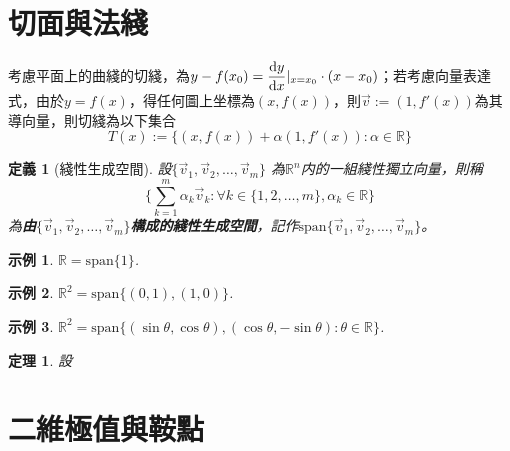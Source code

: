 \documentclass[12pt]{article}
\newtheorem{definition}{定義}
\newtheorem*{theorem}{定理}
\newtheorem*{example}{示例}
\begin{document}
    \section*{切面與法綫}

    考慮平面上的曲綫的切綫，為$\displaystyle y-f(x_0)=\derivative{y}{x}|_{x=x_0} \cdot (x-x_0)$；若考慮向量表達式，由於$y=f(x)$，得任何圖上坐標為$(x,f(x))$，則$\vec{v}:=(1,f'(x))$為其導向量，則切綫為以下集合$$T(x):=\{(x,f(x))+\alpha(1,f'(x)):\alpha\in\mathbb{R}\}$$

    \begin{definition}[綫性生成空間]
        設$\{\vec{v}_1, \vec{v}_2,\dots,\vec{v}_m\}$ 為$\mathbb{R}^n$内的一組綫性獨立向量，則稱$$\{\sum_{k=1}^{m}\alpha_k \vec{v}_k: \forall k \in \{1,2,\dots,m\},\alpha_k\in\mathbb{R}\}$$
        為\textbf{由$\{\vec{v}_1, \vec{v}_2,\dots,\vec{v}_m\}$構成的綫性生成空間}，記作$\mathrm{span}\{\vec{v}_1, \vec{v}_2,\dots, \vec{v}_m\}$。
    \end{definition}

    \begin{example}
        $\mathbb{R}=\mathrm{span}\{1\}$.
    \end{example}

    \begin{example}
        $\mathbb{R}^2=\mathrm{span}\{(0,1),(1,0)\}$.
    \end{example}

    \begin{example}
        $\mathbb{R}^2=\mathrm{span}\{(\sin{\theta},\cos{\theta}),(\cos{\theta},-\sin{\theta}):\theta\in\mathbb{R}\}$.
    \end{example}

    \begin{theorem}
        設$$
    \end{theorem}

    \section*{二維極值與鞍點}
\end{document}
